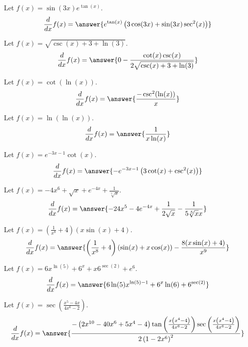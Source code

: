 \documentclass{ximera}
\begin{document}
\begin{shuffle}
\begin{exercise}
Let $f(x)=\sin (3 x) e^{\tan (x)}$.
\[
\ddx f(x) = \answer{e^{\tan (x)} \left(3 \cos (3 x)+\sin (3 x) \sec ^2(x)\right)}
\]
\end{exercise}

\begin{exercise}
Let $f(x)=\sqrt{\csc (x)+3+\ln (3)}$.
\[
\ddx f(x) = \answer{0-\frac{\cot (x) \csc (x)}{2 \sqrt{\csc (x)+3+\ln (3)}}}
\]
\end{exercise}

\begin{exercise}
Let $f(x)=\cot (\ln (x))$.
\[
\ddx f(x) = \answer{\frac{-\csc ^2(\ln (x))}{x}}
\]
\end{exercise}

\begin{exercise}
Let $f(x)=\ln (\ln (x))$.
\[
\ddx f(x) = \answer{\frac{1}{x \ln (x)}}
\]
\end{exercise}

\begin{exercise}
Let $f(x)=e^{-3 x-1} \cot (x)$.
\[
\ddx f(x) = \answer{-e^{-3 x-1} \left(3 \cot (x)+\csc ^2(x)\right)}
\]
\end{exercise}

\begin{exercise}
Let $f(x)=-4 x^6+\sqrt{x}+e^{-4 x}+\frac{1}{\sqrt[5]{x}}$.
\[
\ddx f(x) = \answer{-24 x^5-4 e^{-4 x}+\frac{1}{2 \sqrt{x}}-\frac{1}{5 \sqrt[5]{x} x}}
\]
\end{exercise}

\begin{exercise}
Let $f(x)=\left(\frac{1}{x^8}+4\right) (x \sin (x)+4)$.
\[
\ddx f(x) = \answer{\left(\frac{1}{x^8}+4\right) (\sin (x)+x \cos (x))-\frac{8 (x \sin (x)+4)}{x^9}}
\]
\end{exercise}

\begin{exercise}
Let $f(x)=6 x^{\ln (5)}+6^x+x 6^{\sec (2)}+e^6$.
\[
\ddx f(x) = \answer{6 \ln (5) x^{\ln (5)-1}+6^x \ln (6)+6^{\sec (2)}}
\]
\end{exercise}

\begin{exercise}
Let $f(x)=\sec \left(\frac{x^5-4 x}{4 x^6-2}\right)$.
\[
\ddx f(x) = \answer{\frac{-\left(2 x^{10}-40 x^6+5 x^4-4\right) \tan \left(\frac{x \left(x^4-4\right)}{4 x^6-2}\right) \sec \left(\frac{x \left(x^4-4\right)}{4 x^6-2}\right)}{2 \left(1-2 x^6\right)^2}}
\]
\end{exercise}


\end{shuffle}
\end{document}
